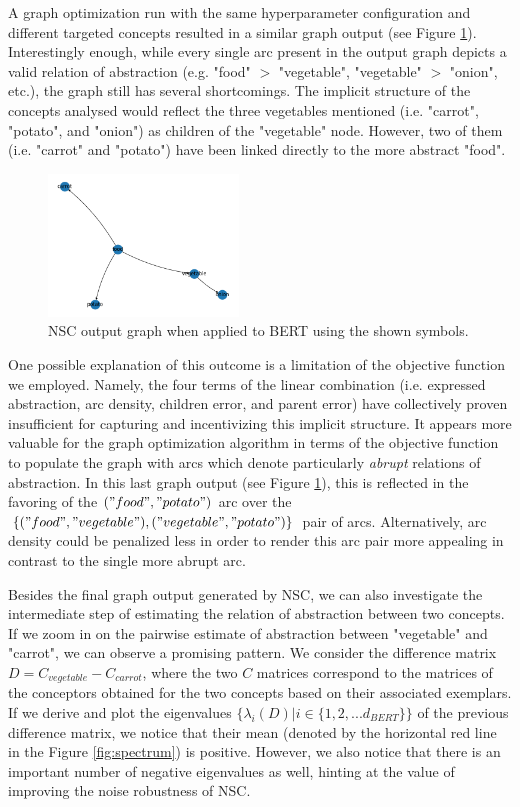 A graph optimization run with the same hyperparameter configuration and different targeted concepts resulted in a similar graph output (see Figure \ref{fig:valuable}). Interestingly enough, while every single arc present in the output graph depicts a valid relation of abstraction (e.g. "food" $>$ "vegetable", "vegetable" $>$ "onion", etc.), the graph still has several shortcomings. The implicit structure of the concepts analysed would reflect the three vegetables mentioned (i.e. "carrot", "potato", and "onion") as children of the "vegetable" node. However, two of them (i.e. "carrot" and "potato") have been linked directly to the more abstract "food".

\begin{figure}[h]
    \centering
    \includegraphics[width=0.45\textwidth]{img/valuable contrasts.png}
    \caption{NSC output graph when applied to BERT using the shown symbols.}\label{fig:valuable}
\end{figure}

One possible explanation of this outcome is a limitation of the objective function we employed. Namely, the four terms of the linear combination (i.e. expressed abstraction, arc density, children error, and parent error) have collectively proven insufficient for capturing and incentivizing this implicit structure. It appears more valuable for the graph optimization algorithm in terms of the objective function to populate the graph with arcs which denote particularly \textit{abrupt} relations of abstraction. In this last graph output (see Figure \ref{fig:valuable}), this is reflected in the favoring of the $("food", "potato")$ arc over the $\{("food", "vegetable"), ("vegetable", "potato")\}$ pair of arcs. Alternatively, arc density could be penalized less in order to render this arc pair more appealing in contrast to the single more abrupt arc.

Besides the final graph output generated by NSC, we can also investigate the intermediate step of estimating the relation of abstraction between two concepts. If we zoom in on the pairwise estimate of abstraction between "vegetable" and "carrot", we can observe a promising pattern. We consider the difference matrix $D = C_{vegetable} - C_{carrot}$, where the two $C$ matrices correspond to the matrices of the conceptors obtained for the two concepts based on their associated exemplars. If we derive and plot the eigenvalues $\{\lambda_{i}(D)|i \in \{1, 2, ... d_{BERT}\}\}$ of the previous difference matrix, we notice that their mean (denoted by the horizontal red line in the Figure \ref{fig:spectrum}) is positive. However, we also notice that there is an important number of negative eigenvalues as well, hinting at the value of improving the noise robustness of NSC.

